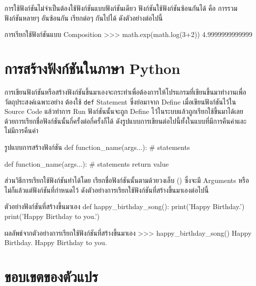 การใช้ฟังก์ชันไม่จำเป็นต้องใช้ฟังก์ชันแบบฟังก์ชันเดียว ฟังก์ชันใช้ฟังก์ชันซ้อนกันได้ คือ การรวมฟังก์ชันหลายๆ อันซ้อนกัน เรียกต่อๆ กันไปได้ ดังตัวอย่างต่อไปนี้

\begin{codelist}{การเรียกใช้ฟังก์ชันแบบ Composition}{}
>>> math.exp(math.log(3+2))
4.9999999999999
\end{codelist}

\section{การสร้างฟังก์ชันในภาษา Python}

การเขียนฟังก์ชันหรือสร้างฟังก์ชันขึ้นมาเองจะกระทำเพื่อต้องการให้โปรแกรมที่เขียนขึ้นมาทำงานเพื่อวัตถุประสงค์เฉพาะอย่าง ต้องใช้ \texttt{def} Statement ซึ่งย่อมาจาก Define เมื่อเขียนฟังก์ชันไว้ใน Source Code แล้วทำการ Run ฟังก์ชันนั้นจะถูก Define ไว้ในระบบแล้วถูกเรียกใช้ขึ้นมาได้เลย ด้วยการเรียกชื่อฟังก์ชันนั้นกี่ครั้งต่อกี่ครั้งก็ได้ ดังรูปแบบการเขียนต่อไปนี้ทั้งในแบบที่มีการคืนค่าและไม่มีการคืนค่า

\begin{codelist}{รูปแบบการสร้างฟังก์ชัน}{}
def function_name(args...):
    # statements

def function_name(args...):
    # statements
    return value
\end{codelist}

ส่วนวิธีการเรียกใช้ฟังก์ชันทำได้โดย เรียกชื่อฟังก์ชันนั้นตามด้วยวงเล็บ () ซึ่งจะมี Arguments หรือไม่ก็แล้วแต่ฟังก์ชันที่กำหนดไว้ ดังตัวอย่างการเรียกใช้ฟังก์ชันที่สร้างขึ้นมาเองต่อไปนี้

\begin{codelist}{ตัวอย่างฟังก์ชันที่สร้างขึ้นมาเอง}{}
def happy_birthday_song():
    print('Happy Birthday.')
    print('Happy Birthday to you.')
\end{codelist}

\begin{codelist}{ผลลัพธ์จากตัวอย่างการเรียกใช้ฟังก์ชันที่สร้างขึ้นมาเอง}{}
>>>  happy_birthday_song()
Happy Birthday.
Happy Birthday to you.
\end{codelist}


\section{ขอบเขตของตัวแปร}

